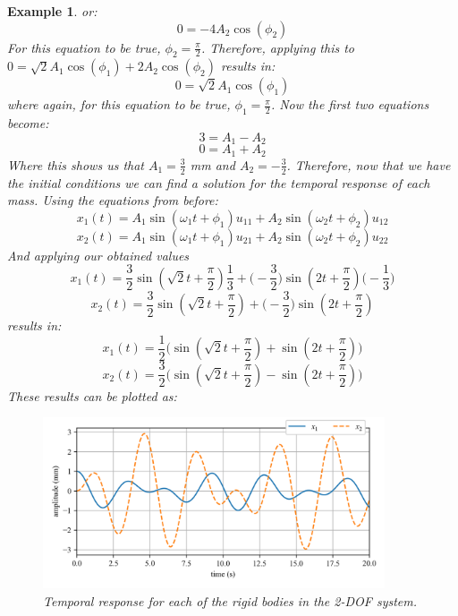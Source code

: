 \documentclass[12pt,letter]{article}
\newtheorem{ex}{Example}
\numberwithin{ex}{section} %
\newenvironment{example}{\begin{mdframed}[middlelinewidth=0.5mm]\begin{ex}\normalfont}{\end{ex}\end{mdframed}}
\numberwithin{re}{section} %
\begin{document}
\begin{example}
or:
\begin{equation}
0= - 4A_2 \cos (\phi_2)
\end{equation}
For this equation to be true, $\phi_2=\frac{\pi}{2}$. Therefore, applying this to $0= \sqrt{2}A_1 \cos (\phi_1 ) + 2A_2 \cos (\phi_2)$ results in:
\begin{equation}
0= \sqrt{2}A_1 \cos (\phi_1 )
\end{equation}
where again, for this equation to be true, $\phi_1=\frac{\pi}{2}$. Now the first two equations become:
\begin{equation}
3= A_1 - A_2 
\end{equation}
\begin{equation}
0= A_1 + A_2 
\end{equation}
Where this shows us that $A_1 = \frac{3}{2}$ mm and $A_2 = -\frac{3}{2}$. Therefore, now that we have the initial conditions we can find a solution for the temporal response of each mass. Using the equations from before:
\begin{equation}
	x_1(t) = A_1 \sin (\omega_1 t + \phi_1 )u_{11} + A_2 \sin (\omega_2 t + \phi_2 )u_{12}
\end{equation}
\begin{equation}
	x_2(t) = A_1 \sin (\omega_1 t + \phi_1 )u_{21} + A_2 \sin (\omega_2 t + \phi_2 )u_{22}
\end{equation}
And applying our obtained values
\begin{equation}
	x_1(t) = \frac{3}{2} \sin (\sqrt{2} t + \frac{\pi}{2} )\frac{1}{3} + \bigg(-\frac{3}{2}\bigg) \sin (2 t + \frac{\pi}{2} ) \bigg(-\frac{1}{3}\bigg)
\end{equation}
\begin{equation}
	x_2(t) = \frac{3}{2} \sin (\sqrt{2} t + \frac{\pi}{2} ) + \bigg(-\frac{3}{2}\bigg) \sin (2 t + \frac{\pi}{2} )
\end{equation}
results in:
\begin{equation}
	x_1(t) = \frac{1}{2} \bigg(  \sin (\sqrt{2} t + \frac{\pi}{2} ) + \sin (2 t + \frac{\pi}{2} ) \bigg)
\end{equation}
\begin{equation}
	x_2(t) = \frac{3}{2}  \bigg( \sin (\sqrt{2} t + \frac{\pi}{2} ) -\sin (2 t + \frac{\pi}{2} ) \bigg)
\end{equation}
These results can be plotted as:
\begin{figure}[H]
	\centering
	\includegraphics[width=0.9\textwidth]{../Figures/2-DOF_response.png}
	\caption{Temporal response for each of the rigid bodies in the 2-DOF system.}
\end{figure}
\end{example}
\end{document}
